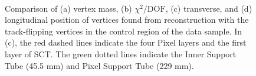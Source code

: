 \begin{figure}[!htb]
    \centering
     \\
    \caption{Comparison of (a) vertex mass, (b) $\chi^{2} / \mathrm{DOF}$, (c) transverse, and (d) longitudinal position of vertices found from reconstruction with the track-flipping vertices in the control region of the data sample. In (c), the red dashed lines indicate the four Pixel layers and the first layer of SCT. The green dotted lines indicate the Inner Support Tube (45.5 mm) and Pixel Support Tube (229 mm).}
    \label{fig:random-crossing_vertex_dist_data}
\end{figure}

